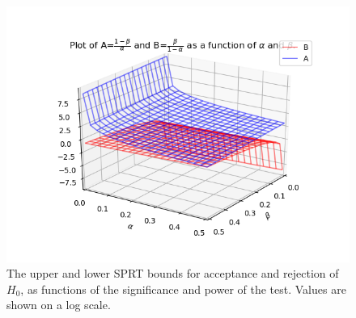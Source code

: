 \begin{figure}[h]
    \centering
    \includegraphics[width = 0.78\linewidth]{Chapters/MultiAgentTargetDetection/Figs/SearchTermination/AandBAsFunctionOfAlphaAndBetaLogTransform.png}
    \caption{The upper and lower SPRT bounds for acceptance and rejection of $H_0$, as functions of the significance and power of the test. Values are shown on a log scale.}
    \label{fig:SPRTCutoffFunctionOfAlphaAndBeta}
\end{figure}



